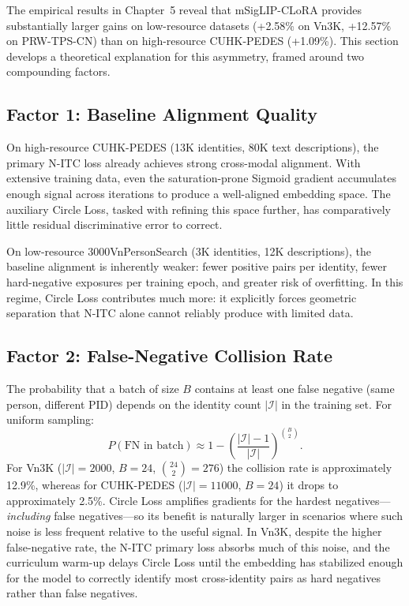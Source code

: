 \documentclass[../main.tex]{subfiles}
\begin{document}
The empirical results in Chapter~5 reveal that mSigLIP-CLoRA provides substantially larger gains on low-resource datasets (+2.58\% on Vn3K, +12.57\% on PRW-TPS-CN) than on high-resource CUHK-PEDES (+1.09\%). This section develops a theoretical explanation for this asymmetry, framed around two compounding factors.

\subsection*{Factor 1: Baseline Alignment Quality}

On high-resource CUHK-PEDES (13K identities, 80K text descriptions), the primary N-ITC loss already achieves strong cross-modal alignment. With extensive training data, even the saturation-prone Sigmoid gradient accumulates enough signal across iterations to produce a well-aligned embedding space. The auxiliary Circle Loss, tasked with refining this space further, has comparatively little residual discriminative error to correct.

On low-resource 3000VnPersonSearch (3K identities, 12K descriptions), the baseline alignment is inherently weaker: fewer positive pairs per identity, fewer hard-negative exposures per training epoch, and greater risk of overfitting. In this regime, Circle Loss contributes much more: it explicitly forces geometric separation that N-ITC alone cannot reliably produce with limited data.

\subsection*{Factor 2: False-Negative Collision Rate}

The probability that a batch of size $B$ contains at least one false negative (same person, different PID) depends on the identity count $|\mathcal{I}|$ in the training set. For uniform sampling:
\[
P(\text{FN in batch}) \approx 1 - \left(\frac{|\mathcal{I}| - 1}{|\mathcal{I}|}\right)^{\binom{B}{2}}.
\]
For Vn3K ($|\mathcal{I}|{=}2000$, $B{=}24$, $\binom{24}{2}{=}276$) the collision rate is approximately 12.9\%, whereas for CUHK-PEDES ($|\mathcal{I}|{=}11000$, $B{=}24$) it drops to approximately 2.5\%. Circle Loss amplifies gradients for the hardest negatives---\textit{including} false negatives---so its benefit is naturally larger in scenarios where such noise is less frequent relative to the useful signal. In Vn3K, despite the higher false-negative rate, the N-ITC primary loss absorbs much of this noise, and the curriculum warm-up delays Circle Loss until the embedding has stabilized enough for the model to correctly identify most cross-identity pairs as hard negatives rather than false negatives.
\end{document}
